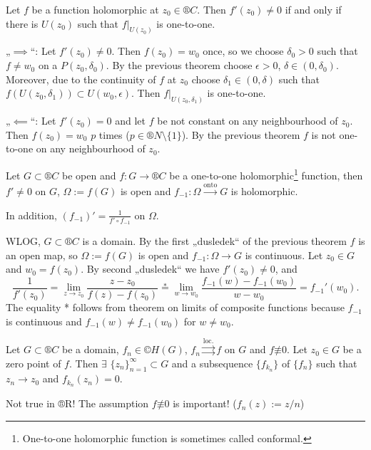 \documentclass[12pt]{article}					%
\begin{document}
\begin{dusledek}
	Let $f$ be a function holomorphic at $z_0 \in ®C$. Then $f'(z_0) ≠ 0$ if and only if there is $U(z_0)$ such that $f|_{U(z_0)}$ is one-to-one.

	\begin{dukazin}
		„$\implies$“: Let $f'(z_0) ≠ 0$. Then $f(z_0) = w_0$ once, so we choose $\delta_0 > 0$ such that $f ≠ w_0$ on a $P(z_0, \delta_0)$. By the previous theorem choose $\epsilon > 0$, $\delta \in (0, \delta_0)$. Moreover, due to the continuity of $f$ at $z_0$ choose $\delta_1 \in (0, \delta)$ such that $f(U(z_0, \delta_1)) \subset U(w_0, \epsilon)$. Then $f|_{U(z_0, \delta_1)}$ is one-to-one.

		„$\impliedby$“: Let $f'(z_0) = 0$ and let $f$ be not constant on any neighbourhood of $z_0$. Then $f(z_0) = w_0$ $p$ times ($p \in ®N \setminus \{1\}$). By the previous theorem $f$ is not one-to-one on any neighbourhood of $z_0$.
	\end{dukazin}
\end{dusledek}

\begin{veta}
	Let $G \subset ®C$ be open and $f: G \rightarrow ®C$ be a one-to-one holomorphic\footnote{One-to-one holomorphic function is sometimes called conformal.} function, then $f' ≠ 0$ on $G$, $\Omega := f(G)$ is open and $f_{-1}: \Omega \overset{\text{onto}}\rightarrow G$ is holomorphic.

	In addition, $(f_{-1})' = \frac{1}{f' \circ f_{-1}}$ on $\Omega$.

	\begin{dukazin}
		WLOG, $G \subset ®C$ is a domain. By the first „dusledek“ of the previous theorem $f$ is an open map, so $\Omega := f(G)$ is open and $f_{-1}: \Omega \rightarrow G$ is continuous. Let $z_0 \in G$ and $w_0 = f(z_0)$. By second „dusledek“ we have $f'(z_0) ≠ 0$, and
		$$ \frac{1}{f'(z_0)} = \lim_{z \rightarrow z_0} \frac{z - z_0}{f(z) - f(z_0)} \overset*= \lim_{w \rightarrow w_0} \frac{f_{-1}(w) - f_{-1}(w_0)}{w - w_0} = f_{-1}'(w_0). $$
		The equality * follows from theorem on limits of composite functions because $f_{-1}$ is continuous and $f_{-1}(w) ≠ f_{-1}(w_0)$ for $w ≠ w_0$.
	\end{dukazin}
\end{veta}

\begin{veta}[Hurwitz]
	Let $G \subset ®C$ be a domain, $f_n \in ©H(G)$, $f_n \overset{\text{loc.}}\rightrightarrows f$ on $G$ and $f \not≡ 0$. Let $z_0 \in G$ be a zero point of $f$. Then $\exists$ $\{z_n\}_{n = 1}^∞ \subset G$ and a subsequence $\{f_{k_n}\}$ of $\{f_n\}$ such that $z_n \rightarrow z_0$ and $f_{k_n}(z_n) = 0$.

	\begin{poznamkain}
		Not true in ®R! The assumption $f \not≡ 0$ is important! ($f_n(z) := z/n$)
	\end{poznamkain}
\end{veta}
\end{document}
